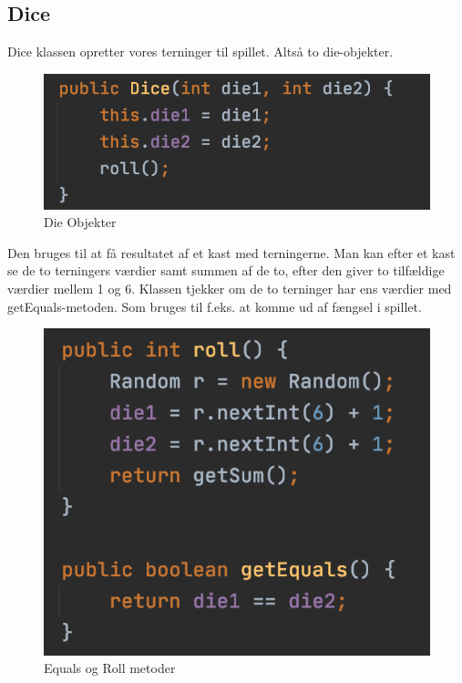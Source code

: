 \subsection{Dice}

Dice klassen opretter vores terninger til spillet. Altså to die-objekter. 

\begin{figure}[H]
    \centering
    \includegraphics[width=\textwidth]{sources/7_implementering/Dice die.png}
    \caption{Die Objekter}
    \label{fig:Die}
\end{figure}
Den bruges til at få resultatet af et kast med terningerne. Man kan efter et kast se de to terningers værdier samt summen af de to, efter den giver to tilfældige værdier mellem 1 og 6. 
Klassen tjekker om de to terninger har ens værdier med getEquals-metoden. Som bruges til f.eks. at komme ud af fængsel i spillet.
\begin{figure}[H]
    \centering
    \includegraphics[width=\textwidth]{sources/7_implementering/Dice Roll_GetEquals}
    \caption{Equals og Roll metoder}
    \label{fig:diceRollEquals}
\end{figure}
